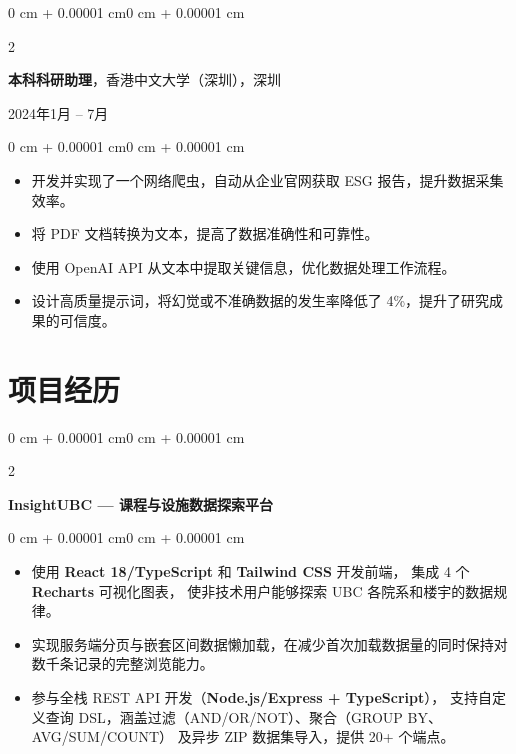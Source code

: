 \documentclass[10pt, letterpaper]{article}
\newenvironment{highlights}{
    \begin{itemize}[
        topsep=0.10 cm,
        parsep=0.10 cm,
        partopsep=0pt,
        itemsep=0pt,
        leftmargin=0 cm + 10pt
    ]
}{
    \end{itemize}
}
\newenvironment{onecolentry}{
    \begin{adjustwidth}{0 cm + 0.00001 cm}{0 cm + 0.00001 cm}
}{
    \end{adjustwidth}
}
\newenvironment{twocolentry}[2][]{
    \onecolentry
    \def\secondColumn{#2}
    \setcolumnwidth{\fill, 4.5 cm}
    \begin{paracol}{2}
}{
    \switchcolumn \raggedleft \secondColumn
    \end{paracol}
    \endonecolentry
}
\begin{document}
    \vspace{0.20 cm}

    \begin{twocolentry}{2024年1月 -- 7月}
        \textbf{本科科研助理}，香港中文大学（深圳），深圳
    \end{twocolentry}

    \vspace{0.10 cm}
    \begin{onecolentry}
        \begin{highlights}
            \item 开发并实现了一个网络爬虫，自动从企业官网获取 ESG 报告，提升数据采集效率。
            \item 将 PDF 文档转换为文本，提高了数据准确性和可靠性。
            \item 使用 OpenAI API 从文本中提取关键信息，优化数据处理工作流程。
            \item 设计高质量提示词，将幻觉或不准确数据的发生率降低了 4\%，提升了研究成果的可信度。
        \end{highlights}
    \end{onecolentry}

    \section{项目经历}

    \begin{twocolentry}{}
        \textbf{InsightUBC — 课程与设施数据探索平台}
    \end{twocolentry}
    \vspace{0.10 cm}
    \begin{onecolentry}
        \begin{highlights}
            \item 使用 \textbf{React 18/TypeScript} 和 \textbf{Tailwind CSS} 开发前端，
            集成 4 个 \textbf{Recharts} 可视化图表，
            使非技术用户能够探索 UBC 各院系和楼宇的数据规律。
            \item 实现服务端分页与嵌套区间数据懒加载，在减少首次加载数据量的同时保持对数千条记录的完整浏览能力。
            \item 参与全栈 REST API 开发（\textbf{Node.js/Express + TypeScript}），
            支持自定义查询 DSL，涵盖过滤（AND/OR/NOT）、聚合（GROUP BY、AVG/SUM/COUNT）
            及异步 ZIP 数据集导入，提供 20+ 个端点。
        \end{highlights}
    \end{onecolentry}
\end{document}
